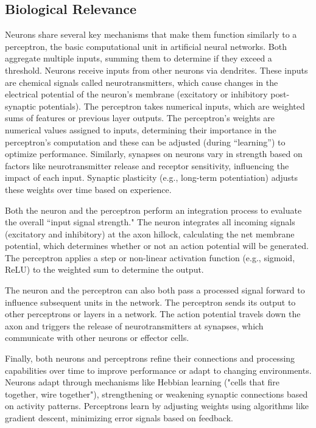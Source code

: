 \subsection{Biological Relevance}
Neurons share several key mechanisms that make them function similarly to a perceptron, the basic computational unit in artificial neural networks. Both aggregate multiple inputs, summing them to determine if they exceed a threshold. Neurons receive inputs from other neurons via dendrites. These inputs are chemical signals called neurotransmitters, which cause changes in the electrical potential of the neuron's membrane (excitatory or inhibitory post-synaptic potentials). The perceptron takes numerical inputs, which are weighted sums of features or previous layer outputs. 
The perceptron’s weights are numerical values assigned to inputs, determining their importance in the perceptron’s computation and these can be adjusted (during “learning”) to optimize performance. Similarly, synapses on neurons vary in strength based on factors like neurotransmitter release and receptor sensitivity, influencing the impact of each input. Synaptic plasticity (e.g., long-term potentiation) adjusts these weights over time based on experience.

Both the neuron and the perceptron perform an integration process to evaluate the overall ``input signal strength." The neuron integrates all incoming signals (excitatory and inhibitory) at the axon hillock, calculating the net membrane potential, which determines whether or not an action potential will be generated. The perceptron applies a step or non-linear activation function (e.g., sigmoid, ReLU) to the weighted sum to determine the output.
	
The neuron and the perceptron can also both pass a processed signal forward to influence subsequent units in the network. The perceptron sends its output to other perceptrons or layers in a network.  The action potential travels down the axon and triggers the release of neurotransmitters at synapses, which communicate with other neurons or effector cells.
	
Finally, both neurons and perceptrons refine their connections and processing capabilities over time to improve performance or adapt to changing environments. Neurons adapt through mechanisms like Hebbian learning ("cells that fire together, wire together"), strengthening or weakening synaptic connections based on activity patterns. Perceptrons learn by adjusting weights using algorithms like gradient descent, minimizing error signals based on feedback.

